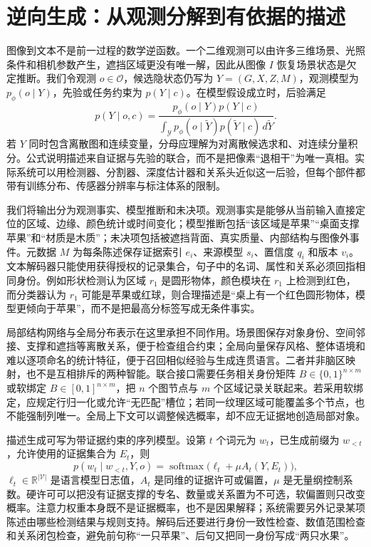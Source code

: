 \section{逆向生成：从观测分解到有依据的描述}
\label{sec:image_text_msc}

图像到文本不是前一过程的数学逆函数。一个二维观测可以由许多三维场景、光照条件和相机参数产生，遮挡区域更没有唯一解，因此从图像 $I$ 恢复场景状态是欠定推断。我们令观测 $o\in\mathcal O$，候选隐状态仍写为 $Y=(G,X,Z,M)$，观测模型为 $p_\phi(o\mid Y)$，先验或任务约束为 $p(Y\mid c)$。在模型假设成立时，后验满足
\begin{equation}
  p(Y\mid o,c)=\frac{p_\phi(o\mid Y)p(Y\mid c)}
  {\int_{\mathcal Y}p_\phi(o\mid \widetilde Y)p(\widetilde Y\mid c)\,d\widetilde Y}.
\end{equation}
若 $Y$ 同时包含离散图和连续变量，分母应理解为对离散候选求和、对连续分量积分。公式说明描述来自证据与先验的联合，而不是把像素“退相干”为唯一真相。实际系统可以用检测器、分割器、深度估计器和关系头近似这一后验，但每个部件都带有训练分布、传感器分辨率与标注体系的限制。

我们将输出分为观测事实、模型推断和未决项。观测事实是能够从当前输入直接定位的区域、边缘、颜色统计或时间变化；模型推断包括“该区域是苹果”“桌面支撑苹果”和“材质是木质”；未决项包括被遮挡背面、真实质量、内部结构与图像外事件。元数据 $M$ 为每条陈述保存证据索引 $e_i$、来源模型 $s_i$、置信度 $q_i$ 和版本 $v_i$。文本解码器只能使用获得授权的记录集合，句子中的名词、属性和关系必须回指相同身份。例如形状检测认为区域 $r_1$ 是圆形物体，颜色模块在 $r_1$ 上检测到红色，而分类器认为 $r_1$ 可能是苹果或红球，则合理描述是“桌上有一个红色圆形物体，模型更倾向于苹果”，而不是把最高分标签写成无条件事实。

局部结构网络与全局分布表示在这里承担不同作用。场景图保存对象身份、空间邻接、支撑和遮挡等离散关系，便于检查组合约束；全局向量保存风格、整体语境和难以逐项命名的统计特征，便于召回相似经验与生成连贯语言。二者并非脑区映射，也不是互相排斥的两种智能。联合接口需要任务相关身份矩阵 $B\in\{0,1\}^{n\times m}$ 或软绑定 $B\in[0,1]^{n\times m}$，把 $n$ 个图节点与 $m$ 个区域记录关联起来。若采用软绑定，应规定行归一化或允许“无匹配”槽位；若同一纹理区域可能覆盖多个节点，也不能强制列唯一。全局上下文可以调整候选概率，却不应无证据地创造局部对象。

描述生成可写为带证据约束的序列模型。设第 $t$ 个词元为 $w_t$，已生成前缀为 $w_{<t}$，允许使用的证据集合为 $E_t$，则
\begin{equation}
  p(w_t\mid w_{<t},Y,o)=\operatorname{softmax}
  \bigl(\ell_t+\mu A_t(Y,E_t)\bigr),
\end{equation}
$\ell_t\in\mathbb R^{|\mathcal V|}$ 是语言模型日志值，$A_t$ 是同维的证据许可或偏置，$\mu$ 是无量纲控制系数。硬许可可以把没有证据支撑的专名、数量或关系置为不可选，软偏置则只改变概率。注意力权重本身既不是证据概率，也不是因果解释；系统需要另外记录某项陈述由哪些检测结果与规则支持。解码后还要进行身份一致性检查、数值范围检查和关系闭包检查，避免前句称“一只苹果”、后句又把同一身份写成“两只水果”。

